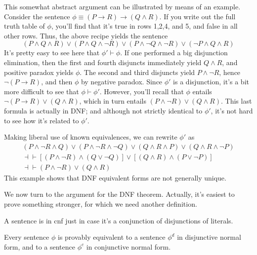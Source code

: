 This somewhat abstract argument can be illustrated by means of an
example.  Consider the sentence $\phi\equiv (P\to R)\to (Q\wedge R)$.
If you write out the full truth table of $\phi$, you'll find that it's
true in rows 1,2,4, and 5, and false in all other rows.  Thus, the
above recipe yields the sentence
\[ (P\wedge Q\wedge R)\vee (P\wedge Q\wedge\neg R)\vee (P\wedge\neg
  Q\wedge \neg R)\vee (\neg P\wedge Q\wedge R) \] It's pretty easy to
see here that $\phi '\vdash \phi$.  If one performed a big disjunction
elimination, then the first and fourth disjuncts immediately yield
$Q\wedge R$, and positive paradox yields $\phi$.  The second and third
disjuncts yield $P\wedge\neg R$, hence $\neg (P\to R)$, and then
$\phi$ by negative paradox.  Since $\phi '$ is a disjunction, it's a
bit more difficult to see that $\phi\vdash \phi '$.  However, you'll
recall that $\phi$ entails $\neg (P\to R)\vee (Q\wedge R)$, which in
turn entails $(P\wedge\neg R)\vee (Q\wedge R)$.  This last formula is
actually in DNF; and although not strictly identical to $\phi '$, it's
not hard to see how it's related to $\phi '$.

Making liberal use of known equivalences, we can rewrite $\phi '$ as
\[ \begin{array}{l} (P\wedge \neg R\wedge Q)\vee (P\wedge \neg R\wedge
    \neg Q)\vee
     (Q\wedge R\wedge P)\vee (Q\wedge R\wedge \neg P)  \\
     \dashv\vdash [(P\wedge \neg R)\wedge (Q\vee \neg Q)]\vee
     [(Q\wedge
     R)\wedge (P\vee \neg P)] \\
     \dashv\vdash (P\wedge \neg R)\vee (Q\wedge R) \end{array} \] This
example shows that DNF equivalent forms are not generally unique.

We now turn to the argument for the DNF theorem.  Actually, it's
easiest to prove something stronger, for which we need another
definition.

\begin{defn} A sentence is in \gls{cnf} just in case it's a
  conjunction of disjunctions of literals. \end{defn}

\begin{dnf} Every sentence $\phi$ is provably equivalent to a sentence
  $\phi ^d$ in disjunctive normal form, and to a sentence $\phi ^c$ in
  conjunctive normal form.  \end{dnf} 

